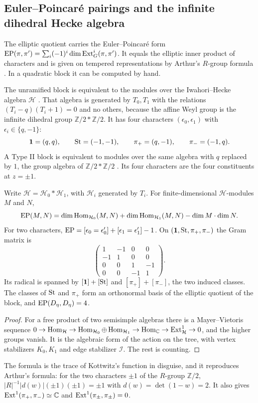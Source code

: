 \subsection{Euler--Poincar\'e pairings and the infinite dihedral Hecke algebra}\label{sub:EP}
The elliptic quotient carries the Euler--Poincar\'e form $\operatorname{EP}(\pi,\pi')=\sum_i(-1)^i\dim\operatorname{Ext}^i_G(\pi,\pi')$. It equals the elliptic inner product of characters \cite{Ka86,SS97} and is given on tempered representations by Arthur's $R$-group formula \cite{Ar93,OS13}. In a quadratic block it can be computed by hand.

The unramified block is equivalent to the modules over the Iwahori--Hecke algebra $\mathcal H$ \cite{Bo76}. That algebra is generated by $T_0,T_1$ with the relations $(T_i-q)(T_i+1)=0$ and no others, because the affine Weyl group is the infinite dihedral group $\mathbb Z/2*\mathbb Z/2$. It has four characters $(\epsilon_0,\epsilon_1)$ with $\epsilon_i\in\{q,-1\}$:
\[
\mathbf 1=(q,q),\qquad\operatorname{St}=(-1,-1),\qquad\pi_+=(q,-1),\qquad\pi_-=(-1,q).
\]
A Type II block is equivalent to modules over the same algebra with $q$ replaced by $1$, the group algebra of $\mathbb Z/2*\mathbb Z/2$ \cite{Ro98}. Its four characters are the four constituents at $z=\pm1$.

\begin{proposition}\label{prop:EP}Write $\mathcal H=\mathcal H_0*\mathcal H_1$, with $\mathcal H_i$ generated by $T_i$. For finite-dimensional $\mathcal H$-modules $M$ and $N$,
\[
\operatorname{EP}(M,N)=\dim\operatorname{Hom}_{\mathcal H_0}(M,N)+\dim\operatorname{Hom}_{\mathcal H_1}(M,N)-\dim M\cdot\dim N .
\]
For two characters, $\operatorname{EP}=[\epsilon_0=\epsilon_0']+[\epsilon_1=\epsilon_1']-1$. On $(\mathbf 1,\operatorname{St},\pi_+,\pi_-)$ the Gram matrix is
\[
\begin{pmatrix}1&-1&0&0\\-1&1&0&0\\0&0&1&-1\\0&0&-1&1\end{pmatrix}.
\]
Its radical is spanned by $[\mathbf 1]+[\operatorname{St}]$ and $[\pi_+]+[\pi_-]$, the two induced classes. The classes of $\operatorname{St}$ and $\pi_+$ form an orthonormal basis of the elliptic quotient of the block, and $\operatorname{EP}(D_\eta,D_\eta)=4$.
\end{proposition}
\begin{proof}
For a free product of two semisimple algebras there is a Mayer--Vietoris sequence $0\to\operatorname{Hom}_{\mathcal H}\to\operatorname{Hom}_{\mathcal H_0}\oplus\operatorname{Hom}_{\mathcal H_1}\to\operatorname{Hom}_{\mathbb C}\to\operatorname{Ext}^1_{\mathcal H}\to0$, and the higher groups vanish. It is the algebraic form of the action on the tree, with vertex stabilizers $K_0,K_1$ and edge stabilizer $\mathcal I$. The rest is counting.
\end{proof}
The formula is the trace of Kottwitz's function in disguise, and it reproduces Arthur's formula: for the two characters $\pm1$ of the $R$-group $\mathbb Z/2$, $|R|^{-1}|d(w)|(\pm1)(\pm1)=\pm1$ with $d(w)=\det(1-w)=2$. It also gives $\operatorname{Ext}^1(\pi_+,\pi_-)\simeq\mathbb C$ and $\operatorname{Ext}^1(\pi_\pm,\pi_\pm)=0$.

